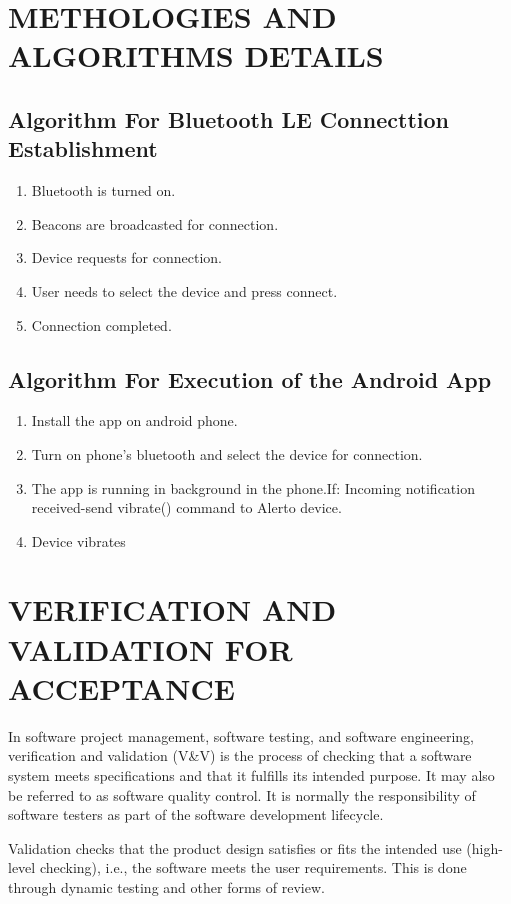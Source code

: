 \documentclass[12pt,a4paper]{report}
\begin{document}
\section{METHOLOGIES AND ALGORITHMS DETAILS}
\subsection{Algorithm For Bluetooth LE Connecttion Establishment}
\begin{enumerate}
	\item Bluetooth is turned on.
	\item Beacons are broadcasted for connection.
	\item Device requests for connection. 
	\item User needs to select the device and press connect.
	\item Connection completed.
\end{enumerate}
\subsection{Algorithm For Execution of the Android App}
\begin{enumerate}
	\item Install the app on android phone.
	\item Turn on phone's bluetooth and select the device for connection. 
	\item The app is running in background in the phone.If:
	Incoming notification received-send vibrate() command to Alerto device.
	\item Device vibrates
\end{enumerate}

\section{VERIFICATION AND VALIDATION FOR ACCEPTANCE}
\hspace{0.2 in}In software project management, software testing, and software engineering, verification and validation (V\&V) is the process of checking that a software system meets specifications and that it fulfills its intended purpose. It may also be referred to as software quality control. It is normally the responsibility of software testers as part of the software development lifecycle.

\hspace{0.2 in}Validation checks that the product design satisfies or fits the intended use (high-level checking), i.e., the software meets the user requirements. This is done through dynamic testing and other forms of review.
\end{document}
